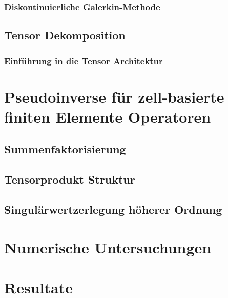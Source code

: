 \documentclass[12pt,a4paper]{scrartcl}
\numberwithin{equation}{section}
\begin{document}
\newpage
\subsubsection{Diskontinuierliche Galerkin-Methode}


\newpage
\subsection{Tensor Dekomposition}
\subsubsection{Einführung in die Tensor Architektur}




\newpage
\section{Pseudoinverse für zell-basierte finiten Elemente Operatoren }

\subsection{Summenfaktorisierung}


\newpage
\subsection{Tensorprodukt Struktur}

\newpage
\subsection{Singulärwertzerlegung höherer Ordnung}




\section{Numerische Untersuchungen}




\section{Resultate}





\newpage




 



\end{document}
